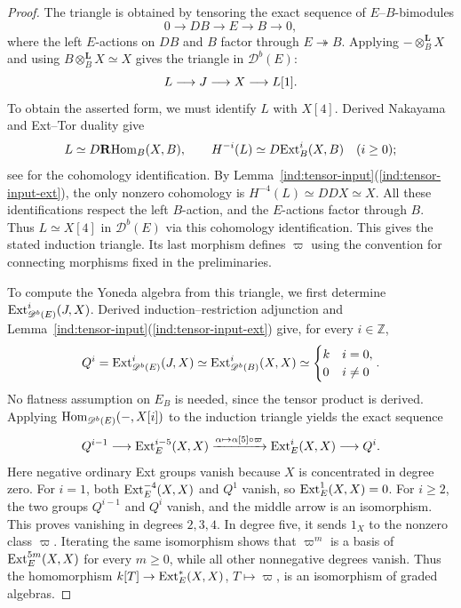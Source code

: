 \documentclass[11pt]{article}
\begin{document}
\begin{proof}
The triangle is obtained by tensoring the exact sequence of
$E$--$B$-bimodules
\[
 0\longrightarrow DB\longrightarrow E\longrightarrow B
 \longrightarrow0,
\]
where the left $E$-actions on $DB$ and $B$ factor through
$E\twoheadrightarrow B$. Applying $-\otimes_B^{\mathbf L}X$ and
using $B\otimes_B^{\mathbf L}X\simeq X$ gives the triangle in $\mathscr D^b(E)$:
$$L\longrightarrow J\longrightarrow X\longrightarrow L[1].$$ To obtain the asserted form, we must
identify $L$ with $X[4]$. Derived Nakayama and Ext--Tor duality give
\[
 L\simeq D\mathbf R{\rm Hom}_B(X,B),\qquad
 H^{-i}(L)\simeq D{\rm Ext}_B^i(X,B)
 \quad(i\ge0);
\]
see \cite[Lemma~9.72]{Rotman} for the cohomology identification.
By Lemma~\ref{ind:tensor-input}\textup{(\ref{ind:tensor-input-ext})}, the only nonzero cohomology is
$H^{-4}(L)\simeq DDX\simeq X$. All these identifications respect
the left $B$-action, and the $E$-actions factor through $B$.
Thus $L\simeq X[4]$ in $\mathscr D^b(E)$ via this cohomology
identification. This gives the stated induction triangle. Its last
morphism defines $\varpi$ using the convention for connecting morphisms
fixed in the preliminaries.

To compute the Yoneda algebra from this triangle, we first determine
${\rm Ext}_{\mathscr D^b(E)}^i(J,X)$. Derived induction--restriction adjunction
\cite[Proposition~4.3.15]{KrauseHTR} and Lemma~\ref{ind:tensor-input}\textup{(\ref{ind:tensor-input-ext})} give, for every
$i\in\mathbb Z$,
\[
 Q^i={\rm Ext}_{\mathscr D^b(E)}^i(J,X)
 \simeq{\rm Ext}_{\mathscr D^b(B)}^i(X,X)
 \simeq\begin{cases}k&i=0,\\0&i\ne0\end{cases}.
\]
No flatness assumption on $E_B$ is needed, since the tensor
product is derived. Applying ${\rm Hom}_{\mathscr D^b(E)}(-,X[i])$ to
the induction triangle yields the exact sequence
\[
 Q^{i-1}\longrightarrow{\rm Ext}_E^{i-5}(X,X)
 \xrightarrow{\alpha\mapsto\alpha[5]\circ\varpi}
 {\rm Ext}_E^i(X,X)\longrightarrow Q^i.
\]
Here negative ordinary Ext groups vanish because $X$ is concentrated
in degree zero. For $i=1$, both ${\rm Ext}_E^{-4}(X,X)$ and $Q^1$ vanish,
so ${\rm Ext}_E^1(X,X)=0$. For $i\ge2$, the two groups $Q^{i-1}$ and
$Q^i$ vanish, and the middle arrow is an isomorphism. This proves
vanishing in degrees $2,3,4$. In degree five, it sends $1_X$ to the
nonzero class $\varpi$. Iterating the same isomorphism shows that
$\varpi^m$ is a basis of ${\rm Ext}_E^{5m}(X,X)$ for every $m\ge0$, while
all other nonnegative degrees vanish. Thus the homomorphism
$k[T]\to{\rm Ext}_E^*(X,X)$, $T\mapsto\varpi$, is an isomorphism of
graded algebras.
\end{proof}
\end{document}
